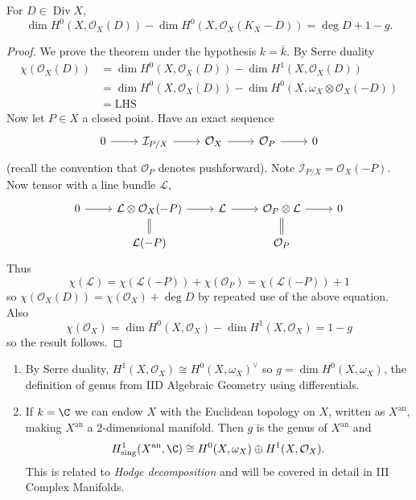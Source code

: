 \documentclass[a4paper]{article}
\newcommand{\sh}[1]{\mathcal{#1}} %
\DeclareMathOperator{\Div}{Div} %
\begin{document}
\begin{theorem}
  For \(D \in \Div X\),
  \[
    \dim H^0(X, \sh O_X(D)) - \dim H^0(X, \sh O_X(K_X - D)) = \deg D + 1 - g.
  \]
\end{theorem}

\begin{proof}
  We prove the theorem under the hypothesis \(k = \overline k\). By Serre duality
  \begin{align*}
    \chi(\sh O_X(D))
    &= \dim H^0(X, \sh O_X(D)) - \dim H^1(X, \sh O_X(D)) \\
    &= \dim H^0(X, \sh O_X(D)) - \dim H^0(X, \omega_X \otimes \sh O_X(-D)) \\
    &= \mathrm{LHS}
  \end{align*}
  Now let \(P \in X\) a closed point. Have an exact sequence
  \[
    \begin{tikzcd}
      0 \ar[r] & \sh I_{P/X} \ar[r] & \sh O_X \ar[r] & \sh O_P \ar[r] & 0
    \end{tikzcd}
  \]
  (recall the convention that \(\sh O_P\) denotes pushforward). Note \(\sh I_{P/X} = \sh O_X(-P)\). Now tensor with a line bundle \(\sh L\),
  \[
    \begin{tikzcd}[row sep=scriptsize]
      0 \ar[r] & \sh L \otimes \sh O_X(-P) \ar[r] \ar[d, equal] & \sh L \ar[r] & \sh O_P \otimes \sh L \ar[r] \ar[d, equal] & 0 \\
      & \sh L(-P) & & \sh O_P
    \end{tikzcd}
  \]
  Thus
  \[
    \chi(\sh L) = \chi(\sh L(-P)) + \chi(\sh O_P) = \chi(\sh L(-P)) + 1
  \]
  so \(\chi(\sh O_X(D)) = \chi(\sh O_X) + \deg D\) by repeated use of the above equation. Also
  \[
    \chi(\sh O_X) = \dim H^0(X, \sh O_X) - \dim H^1(X, \sh O_X) = 1 - g
  \]
  so the result follows.
\end{proof}

\begin{remark}\leavevmode
  \begin{enumerate}
  \item By Serre duality, \(H^1(X, \sh O_X) \cong H^0(X, \omega_X)^\vee\) so \(g = \dim H^0(X, \omega_X)\), the definition of genus from IID Algebraic Geometry using differentials.
  \item If \(k = \C\) we can endow \(X\) with the Euclidean topology on \(X\), written as \(X^{\mathrm{an}}\), making \(X^{\mathrm{an}}\) a \(2\)-dimensional manifold. Then \(g\) is the genus of \(X^{\mathrm{an}}\) and
    \[
      H^1_{\mathrm{sing}}(X^{\mathrm{an}}, \C) \cong H^0(X, \omega_X) \oplus H^1(X, \sh O_X).
    \]
    This is related to \emph{Hodge decomposition} and will be covered in detail in III Complex Manifolds.
  \end{enumerate}
\end{remark}
\end{document}
